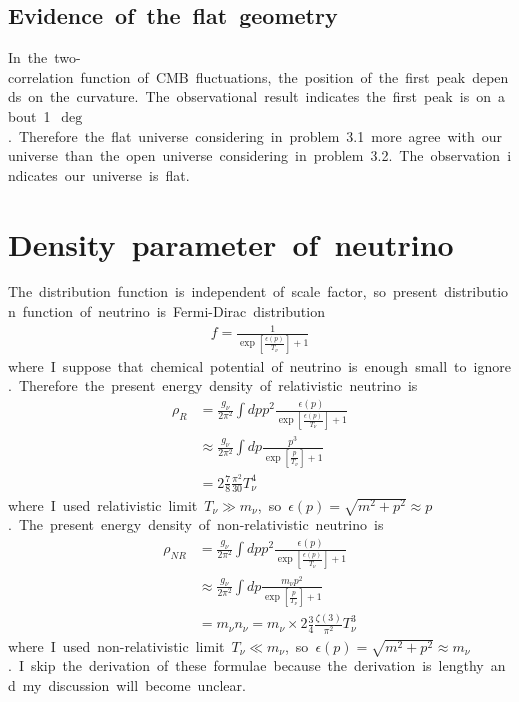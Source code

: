 \subsection{Evidence\ of\ the\ flat\ geometry}
In\ the\ two-correlation\ function\ of\ CMB\ fluctuations,\ the\ position\ of\ the\ first\ peak\ depends\ on\ the\ curvature.\ The\ observational\ result\ indicates\ the\ first\ peak\ is\ on\ about\ 1\ $\deg$.\ Therefore\ the\ flat\ universe\ considering\ in\ problem\ 3.1\ more\ agree\ with\ our\ universe\ than\ the\ open\ universe\ considering\ in\ problem\ 3.2.\ The\ observation\ indicates\ our\ universe\ is\ flat.

\section{Density\ parameter\ of\ neutrino}
The\ distribution\ function\ is\ independent\ of\ scale\ factor,\ so\ present\ distribution\ function\ of\ neutrino\ is\ Fermi-Dirac\ distribution
\begin{align*}
    f=\frac{1}{\exp\left[\frac{\epsilon(p)}{T_{\nu}}\right]+1}
\end{align*}
where\ I\ suppose\ that\ chemical\ potential\ of\ neutrino\ is\ enough\ small\ to\ ignore.\ Therefore\ the\ present\ energy\ density\ of\ relativistic\ neutrino\ is\
\begin{align*}
    \rho_R&=\frac{g_{\nu}}{2\pi^2}\int dpp^2\frac{\epsilon(p)}{\exp\left[\frac{\epsilon(p)}{T_{\nu}}\right]+1}\\
    &\approx\frac{g_{\nu}}{2\pi^2}\int dp\frac{p^3}{\exp\left[\frac{p}{T_{\nu}}\right]+1}\\
    &=2\frac{7}{8}\frac{\pi^2}{30}T^4_{\nu}
\end{align*}
where\ I\ used\ relativistic\ limit\ $T_{\nu}\gg m_{\nu}$,\ so\ $\epsilon(p)=\sqrt{m^2+p^2}\approx p$.\ The\ present\ energy\ density\ of\ non-relativistic\ neutrino\ is
\begin{align*}
    \rho_{NR}&=\frac{g_{\nu}}{2\pi^2}\int dpp^2\frac{\epsilon(p)}{\exp\left[\frac{\epsilon(p)}{T_{\nu}}\right]+1}\\
    &\approx\frac{g_{\nu}}{2\pi^2}\int dp\frac{m_{\nu}p^2}{\exp\left[\frac{p}{T_{\nu}}\right]+1}\\
    &=m_{\nu}n_{\nu}=m_{\nu}\times2\frac{3}{4}\frac{\zeta(3)}{\pi^2}T^3_{\nu}
\end{align*}
where\ I\ used\ non-relativistic\ limit\ $T_{\nu}\ll m_{\nu}$,\ so\ $\epsilon(p)=\sqrt{m^2+p^2}\approx m_{\nu}$.\ I\ skip\ the\ derivation\ of\ these\ formulae\ because\ the\ derivation\ is\ lengthy\ and\ my\ discussion\ will\ become\ unclear.

